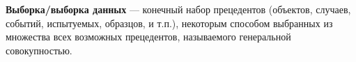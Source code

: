 \Abbreviations %
\textbf{Выборка/выборка данных}  — конечный набор прецедентов (объектов, случаев, событий, испытуемых, образцов, и т.п.), некоторым способом выбранных из множества всех возможных прецедентов, называемого генеральной совокупностью\cite{def01}.
